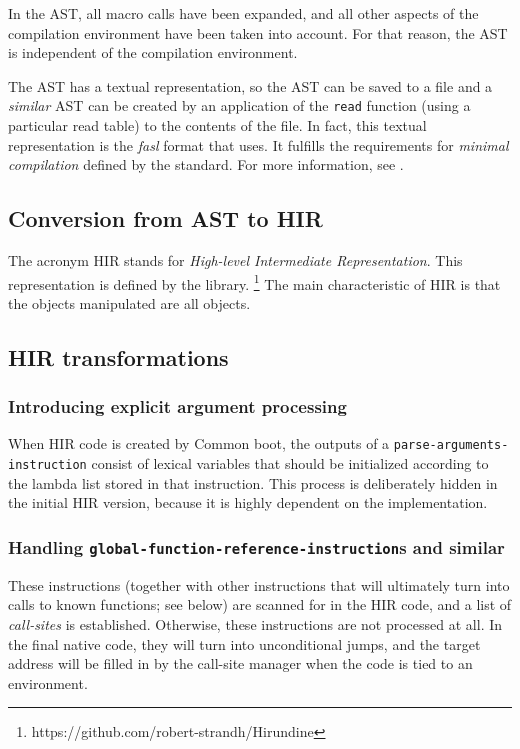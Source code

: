 In the AST, all macro calls have been expanded, and all other aspects
of the compilation environment have been taken into account.  For that
reason, the AST is independent of the compilation environment.

The AST has a textual representation, so the AST can be saved to a
file and a \emph{similar} AST can be created by an application of the
\texttt{read} function (using a particular read table) to the contents
of the file.  In fact, this textual representation is the \emph{fasl}
format that \sysname{} uses.  It fulfills the requirements for
\emph{minimal compilation} defined by the \commonlisp{} standard.
For more information, see .

\subsection{Conversion from AST to HIR}

The acronym HIR stands for \emph{High-level Intermediate
  Representation}.  This representation is defined by the \hirundine{}
library.%
\footnote{https://github.com/robert-strandh/Hirundine}
The main characteristic of HIR is that the objects manipulated are all
\commonlisp{} objects.

\subsection{HIR transformations}

\subsubsection{Introducing explicit argument processing}

When HIR code is created by Common boot, the outputs of a
\texttt{parse-arguments-instruction} consist of lexical variables that
should be initialized according to the lambda list stored in that
instruction.  This process is deliberately hidden in the initial HIR
version, because it is highly dependent on the implementation.

\subsubsection{Handling \texttt{global-function-reference-instruction}s and similar}

These instructions (together with other instructions that will
ultimately turn into calls to known functions; see below) are scanned
for in the HIR code, and a list of \emph{call-sites} is established.
Otherwise, these instructions are not processed at all.  In the final
native code, they will turn into unconditional jumps, and the target
address will be filled in by the call-site manager when the code is
tied to an environment.

